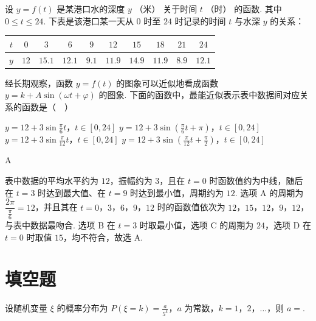 \begin{problem}
设 \( y = f(t) \) 是某港口水的深度 \( y \) （米） 关于时间 \( t \) （时） 的函数. 其中 \( 0 \leqslant t \leqslant 24 \). 下表是该港口某一天从 \(0\) 时至 \(24\) 时记录的时间 \( t \) 与水深 \( y \) 的关系：

\begin{center}
\begin{tabular}{|c|c|c|c|c|c|c|c|c|c|}
\hline
\(t\) & \(0\) & \(3\) & \(6\) & \(9\) & \(12\) & \(15\) & \(18\) & \(21\) & \(24\) \\
\hline
\(y\) & \(12\) & \(15.1\) & \(12.1\) & \(9.1\) & \(11.9\) & \(14.9\) & \(11.9\) & \(8.9\) & \(12.1\) \\
\hline
\end{tabular}
\end{center}

经长期观察，函数 \( y = f(t) \) 的图象可以近似地看成函数 \( y = k + A \sin(\omega t + \varphi) \) 的图象. 下面的函数中，最能近似表示表中数据间对应关系的函数是（\(\quad\)）

\choices
    {\( y = 12 + 3\sin \frac{\pi}{6} t \)，\(t \in [0, 24]\)}
    {\(y = 12 + 3\sin \left(\frac{\pi}{6} t + \pi\right)\)，\(t \in [0, 24]\)}
    {\(y = 12 + 3\sin \frac{\pi}{12} t\)，\(t \in [0, 24]\)}
    {\(y = 12 + 3\sin \left(\frac{\pi}{12} t + \frac{\pi}{2}\right)\)，\(t \in [0, 24]\)}
\end{problem}

\begin{answer}
A
\end{answer}

\begin{solution}
表中数据的平均水平约为 \(12\)，振幅约为 \(3\)，且在 \(t=0\) 时函数值约为中线，随后在 \(t=3\) 时达到最大值、在 \(t=9\) 时达到最小值，周期约为 \(12\). 选项 A 的周期为 \(\dfrac{2\pi}{\frac{\pi}{6}}=12\)，并且其在 \(t=0\)，\(3\)，\(6\)，\(9\)，\(12\) 时的函数值依次为 \(12\)，\(15\)，\(12\)，\(9\)，\(12\)，与表中数据最吻合. 选项 B 在 \(t=3\) 时取最小值，选项 C 的周期为 \(24\)，选项 D 在 \(t=0\) 时取值 \(15\)，均不符合，故选 A.
\end{solution}

\section{填空题}
\begin{problem}
设随机变量 \(\xi\) 的概率分布为 \(P(\xi = k) = \frac{a}{5^k}\)，\(a\) 为常数，\(k = 1\)，\(2\)，\(\dots\)，则 \(a = \)\fillinblank{}.
\end{problem}

